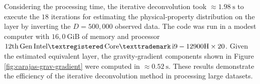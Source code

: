 Considering the processing time, the iterative deconvolution took  $\approx 1.98 \: \mathrm{s}$ to execute the $18$
iterations for estimating the physical-property distribution on the layer by inverting the $D = 500,000$ observed data.
The code was run in a modest computer with $16,0 \: \mathrm{GiB}$ of memory and processor 
$\mathrm{12th \, Gen \, Intel\textregistered \, Core\texttrademark \, i9-12900H \times 20}$.
Given the estimated equivalent layer, the gravity-gradient components shown in Figure \ref{fig:carajas-grav-gradient} were computed in
$\approx 0.52 \: \mathrm{s}$.
These results demonstrate the efficiency of the iterative deconvolution method in processing large datasets.





%
%
%
%
%
%
%
%
%
%
%
%
%
%
%

